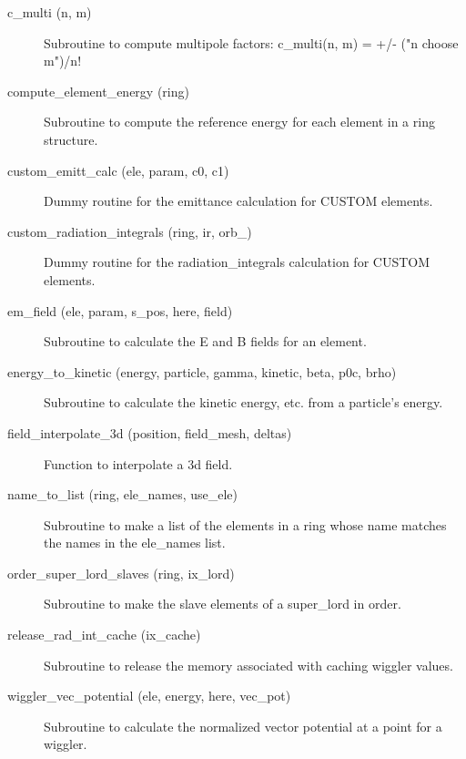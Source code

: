 \begin{description}

\item[c\_multi (n, m)] \Newline
Subroutine to compute multipole factors: 
c\_multi(n, m) = +/- ("n choose m")/n! 

\item[compute\_element\_energy (ring)] \Newline
Subroutine to compute the reference energy for each element in a ring 
structure. 

\item[custom\_emitt\_calc (ele, param, c0, c1)] \Newline
Dummy routine for the emittance calculation for CUSTOM elements. 

\item[custom\_radiation\_integrals (ring, ir, orb\_)] \Newline
Dummy routine for the radiation\_integrals calculation for CUSTOM elements. 

\item[em\_field (ele, param, s\_pos, here, field)] \Newline
Subroutine to calculate the E and B fields for an element. 

\item[energy\_to\_kinetic (energy, particle, gamma, kinetic, beta, p0c, brho)] \Newline
Subroutine to calculate the kinetic energy, etc. from a particle's energy. 

\item[field\_interpolate\_3d (position, field\_mesh, deltas)] \Newline
Function to interpolate a 3d field. 

\item[name\_to\_list (ring, ele\_names, use\_ele)] \Newline
Subroutine to make a list of the elements in a ring 
whose name matches the names in the ele\_names list. 

\item[order\_super\_lord\_slaves (ring, ix\_lord)] \Newline
Subroutine to make the slave elements of a super\_lord in order. 

\item[release\_rad\_int\_cache (ix\_cache)] \Newline 
     Subroutine to release the memory associated with caching wiggler values.

\item[wiggler\_vec\_potential (ele, energy, here, vec\_pot)] \Newline
Subroutine to calculate the normalized vector potential at a point for a wiggler.

\end{description}

